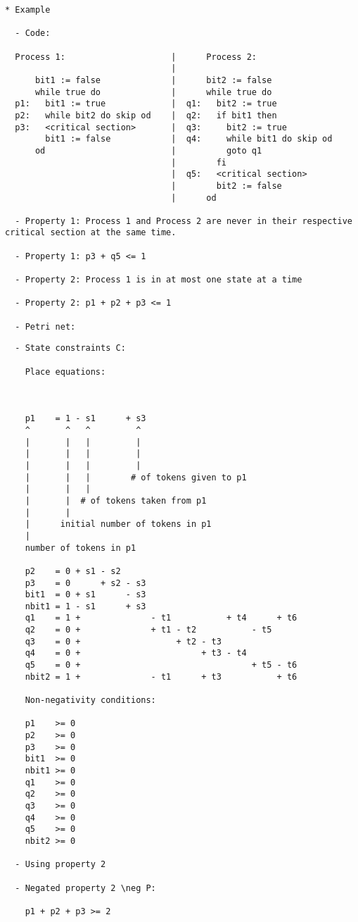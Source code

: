 \documentclass{llncs}
\begin{document}
\begin{verbatim}
* Example

  - Code:

  Process 1:                     |      Process 2:
                                 |
      bit1 := false              |      bit2 := false
      while true do              |      while true do
  p1:   bit1 := true             |  q1:   bit2 := true
  p2:   while bit2 do skip od    |  q2:   if bit1 then
  p3:   <critical section>       |  q3:     bit2 := true
        bit1 := false            |  q4:     while bit1 do skip od
      od                         |          goto q1
                                 |        fi
                                 |  q5:   <critical section>
                                 |        bit2 := false
                                 |      od

  - Property 1: Process 1 and Process 2 are never in their respective critical section at the same time.

  - Property 1: p3 + q5 <= 1

  - Property 2: Process 1 is in at most one state at a time

  - Property 2: p1 + p2 + p3 <= 1

  - Petri net:

\end{verbatim}



\newpage

\begin{verbatim}
  - State constraints C:

    Place equations:
  


    p1    = 1 - s1      + s3
    ^       ^   ^         ^
    |       |   |         |
    |       |   |         |
    |       |   |         |
    |       |   |        # of tokens given to p1
    |       |   |    
    |       |  # of tokens taken from p1
    |       |
    |      initial number of tokens in p1
    |
    number of tokens in p1

    p2    = 0 + s1 - s2
    p3    = 0      + s2 - s3
    bit1  = 0 + s1      - s3
    nbit1 = 1 - s1      + s3
    q1    = 1 +              - t1           + t4      + t6
    q2    = 0 +              + t1 - t2           - t5
    q3    = 0 +                   + t2 - t3
    q4    = 0 +                        + t3 - t4
    q5    = 0 +                                  + t5 - t6
    nbit2 = 1 +              - t1      + t3           + t6
    
    Non-negativity conditions:
  
    p1    >= 0
    p2    >= 0
    p3    >= 0
    bit1  >= 0
    nbit1 >= 0
    q1    >= 0
    q2    >= 0
    q3    >= 0
    q4    >= 0
    q5    >= 0
    nbit2 >= 0

  - Using property 2
  
  - Negated property 2 \neg P:

    p1 + p2 + p3 >= 2
\end{verbatim}
\end{document}
